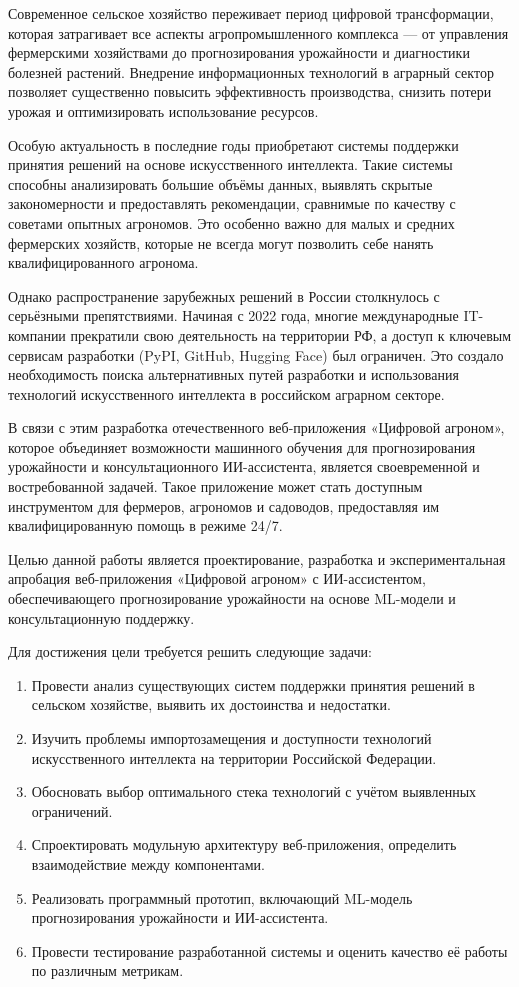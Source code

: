 \documentclass[14pt, a4paper]{extarticle}
\begin{document}
    Современное сельское хозяйство переживает период цифровой трансформации, которая затрагивает все аспекты агропромышленного комплекса — от управления фермерскими хозяйствами до прогнозирования урожайности и диагностики болезней растений. Внедрение информационных технологий в аграрный сектор позволяет существенно повысить эффективность производства, снизить потери урожая и оптимизировать использование ресурсов.

    Особую актуальность в последние годы приобретают системы поддержки принятия решений на основе искусственного интеллекта. Такие системы способны анализировать большие объёмы данных, выявлять скрытые закономерности и предоставлять рекомендации, сравнимые по качеству с советами опытных агрономов. Это особенно важно для малых и средних фермерских хозяйств, которые не всегда могут позволить себе нанять квалифицированного агронома.

    Однако распространение зарубежных решений в России столкнулось с серьёзными препятствиями. Начиная с 2022 года, многие международные IT-компании прекратили свою деятельность на территории РФ, а доступ к ключевым сервисам разработки (PyPI, GitHub, Hugging Face) был ограничен. Это создало необходимость поиска альтернативных путей разработки и использования технологий искусственного интеллекта в российском аграрном секторе.

    В связи с этим разработка отечественного веб-приложения «Цифровой агроном», которое объединяет возможности машинного обучения для прогнозирования урожайности и консультационного ИИ-ассистента, является своевременной и востребованной задачей. Такое приложение может стать доступным инструментом для фермеров, агрономов и садоводов, предоставляя им квалифицированную помощь в режиме 24/7.

    Целью данной работы является проектирование, разработка и экспериментальная апробация веб-приложения «Цифровой агроном» с ИИ-ассистентом, обеспечивающего прогнозирование урожайности на основе ML-модели и консультационную поддержку.

    Для достижения цели требуется решить следующие задачи:
    \begin{enumerate}
        \item Провести анализ существующих систем поддержки принятия решений в сельском хозяйстве, выявить их достоинства и недостатки.
        \item Изучить проблемы импортозамещения и доступности технологий искусственного интеллекта на территории Российской Федерации.
        \item Обосновать выбор оптимального стека технологий с учётом выявленных ограничений.
        \item Спроектировать модульную архитектуру веб-приложения, определить взаимодействие между компонентами.
        \item Реализовать программный прототип, включающий ML-модель прогнозирования урожайности и ИИ-ассистента.
        \item Провести тестирование разработанной системы и оценить качество её работы по различным метрикам.
    \end{enumerate}
\end{document}
